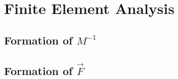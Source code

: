 \section{Finite Element Analysis}





\subsection{Formation of $M^{-1}$}
\subsection{Formation of $\vec{F}$}
